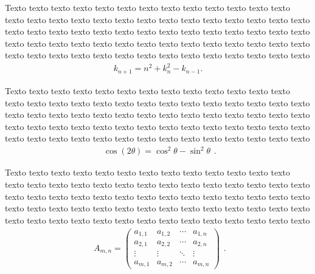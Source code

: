 Texto texto texto texto texto texto texto texto texto texto texto texto texto texto texto texto texto texto texto texto texto texto texto texto texto texto texto texto texto texto texto texto texto texto texto texto texto texto texto texto texto texto texto texto texto texto texto texto texto texto texto texto texto texto texto texto texto texto texto texto texto texto texto texto texto texto texto texto texto
	\begin{equation}
		\begin{aligned}
			k_{n+1} = n^2 + k_n^2 - k_{n-1}.
		\end{aligned}
	\end{equation}
	
Texto texto texto texto texto texto texto texto texto texto texto texto texto texto texto texto texto texto texto texto texto texto texto texto texto texto texto texto texto texto texto texto texto texto texto texto texto texto texto texto texto texto texto texto texto texto texto texto texto texto texto texto texto texto texto texto texto texto texto texto texto texto texto texto texto texto texto texto texto
	\begin{equation}
	\label{eq:trigo}
		\begin{aligned}
			\cos (2\theta) = \cos^2 \theta - \sin^2 \theta
		\end{aligned}.
	\end{equation}
	
Texto texto texto texto texto texto texto texto texto texto texto texto texto texto texto texto texto texto texto texto texto texto texto texto texto texto texto texto texto texto texto texto texto texto texto texto texto texto texto texto texto texto texto texto texto texto texto texto texto texto texto texto texto texto texto texto texto texto texto texto texto texto texto texto texto texto texto texto texto
	\begin{equation}
	\label{eq:matriz}
		\begin{aligned}
			A_{m,n} =
			\begin{pmatrix}
			a_{1,1} & a_{1,2} & \cdots & a_{1,n} \\
			a_{2,1} & a_{2,2} & \cdots & a_{2,n} \\
			\vdots  & \vdots  & \ddots & \vdots  \\
			a_{m,1} & a_{m,2} & \cdots & a_{m,n}
			\end{pmatrix}
		\end{aligned}.
	\end{equation}

